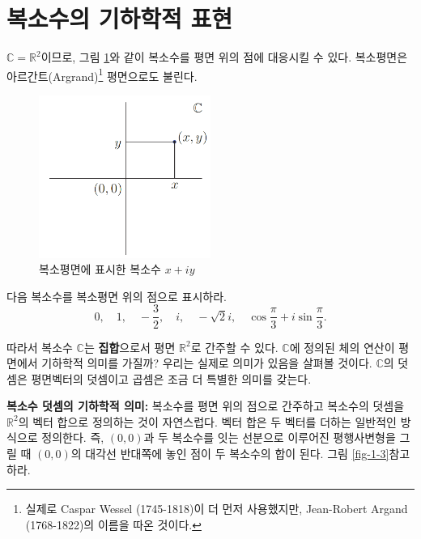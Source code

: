 \section{복소수의 기하학적 표현}

$\mathbb C = \mathbb R^2$이므로, 
그림 \ref{fig-1-2}와 같이 복소수를 평면 위의 점에 대응시킬 수 있다.
복소평면은  아르간트(Argrand)\footnote{ 
실제로 Caspar Wessel (1745-1818)이 더 먼저 사용했지만,
Jean-Robert Argand (1768-1822)의 이름을 따온 것이다.} 
평면으로도 불린다.

\begin{figure}[!h]
\begin{center}
\includegraphics[width=0.5\textwidth]{./SaltChapter/figs/fig-1-2}
\end{center}
\caption{복소평면에 표시한 복소수 $x+iy$}
\label{fig-1-2}
\end{figure}


\begin{salt_exercise} \label{ex-1-4}
다음 복소수를 복소평면 위의 점으로 표시하라.
$$
0, \quad 1 , \quad -\frac32, \quad i, \quad -\sqrt{2}i,
\quad \cos \frac\pi3 + i\sin\frac\pi3.
$$
\end{salt_exercise}

따라서 복소수 $\mathbb C$는 {\bf 집합}으로서 평면 $\mathbb R^2$로 간주할 수 있다.
$\mathbb C$에 정의된 체의 연산이 평면에서 기하학적 의미를 가질까?
우리는 실제로 의미가 있음을 살펴볼 것이다.
$\mathbb C$의 덧셈은 평면벡터의 덧셈이고
곱셈은 조금 더 특별한 의미를 갖는다.

{\bf 복소수 덧셈의 기하학적 의미: }
복소수를 평면 위의 점으로 간주하고 복소수의 덧셈을 $\mathbb R^2$의 벡터 합으로 
정의하는 것이 자연스럽다. 
벡터 합은 두 벡터를 더하는 일반적인 방식으로 정의한다.
즉, $(0,0)$과 두 복소수를 잇는 선분으로 이루어진 평행사변형을 그릴 때
$(0,0)$의 대각선 반대쪽에 놓인 점이 두 복소수의 합이 된다.
그림 \ref{fig-1-3}\을 참고하라.

